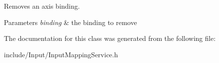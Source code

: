Removes an axis binding.


\begin{DoxyParams}{Parameters}
{\em binding} & the binding to remove \\
\hline
\end{DoxyParams}


The documentation for this class was generated from the following file\+:\begin{DoxyCompactItemize}
\item 
include/\+Input/Input\+Mapping\+Service.\+h\end{DoxyCompactItemize}
